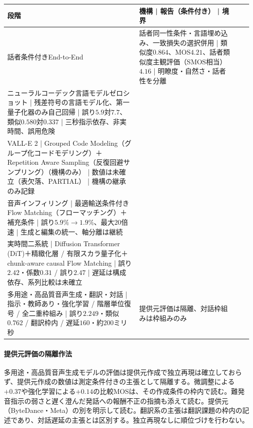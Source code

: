 \documentclass[lualatex,a4paper,10pt]{jlreq}
\begin{document}
\begin{center}
\small
\begin{tabularx}{\textwidth}{@{}p{}p{}p{}X@{}}
\toprule
段階 & 機構 | 報告（条件付き） | 境界 \\
\midrule
話者条件付きEnd-to-End\autocite{btd057} & 話者同一性条件・言語埋め込み、一致損失の選択併用 | 類似度$0.864$、MOS$4.21$、話者類似度主観評価（SMOS相当）$4.16$ | 明瞭度・自然さ・話者性を分離 \\
ニューラルコーデック言語モデルゼロショット\autocite{btd058} | 残差符号の言語モデル化、第一量子化器のみ自己回帰 | 誤り$5.9$対$7.7$、類似$0.580$対$0.337$ | 三秒指示依存、非実時間、誤用危険 \\
VALL-E 2\autocite{btd059} | Grouped Code Modeling（グループ化コードモデリング）＋Repetition Aware Sampling（反復回避サンプリング）（機構のみ） | 数値は未確立（表欠落、PARTIAL） | 機構の継承のみ記録 \\
音声インフィリング\autocite{btd060} | 最適輸送条件付きFlow Matching（フローマッチング）＋補充条件 | 誤り$5.9\%\to1.9\%$、最大$20$倍速 | 生成と編集の統一、軸分離は継続 \\
実時間二系統\autocite{btd132,btd133} | Diffusion Transformer (DiT)＋精緻化層 / 有限スカラ量子化＋chunk-aware causal Flow Matching | 誤り$2.42$・係数$0.31$ / 誤り$2.47$ | 遅延は構成依存、系列比較は未確立 \\
多用途・高品質音声生成・翻訳・対話\autocite{btd061,btd062,btd134} | 指示・教師あり・強化学習 / 階層単位復号 / 全二重枠組み | 誤り$2.249$・類似$0.762$ / 翻訳枠内 / 遅延$160$・約$200$ミリ秒 & 提供元評価は隔離、対話枠組みは枠組みのみ \\
\bottomrule
\end{tabularx}
\end{center}

\paragraph{提供元評価の隔離作法}
多用途・高品質音声生成モデルの評価は提供元作成で独立再現は確立しておらず、提供元作成の数値は測定条件付きの主張として隔離する\autocite{btd061}。微調整による$+0.37$や強化学習による$+0.14$の比較MOSは、その作成条件の枠内で読む\autocite{btd061}。難発音指示の弱さと遅く澄んだ発話への報酬不正の指摘も添えて読む\autocite{btd061}。提供元（ByteDance・Meta）の別を明示して読む\autocite{btd061,btd062}。翻訳系の主張は翻訳課題の枠内の記述であり、対話遅延の主張とは区別する\autocite{btd062}。独立再現なしに順位づけを行わない\autocite{btd061,btd062}。
\end{document}
